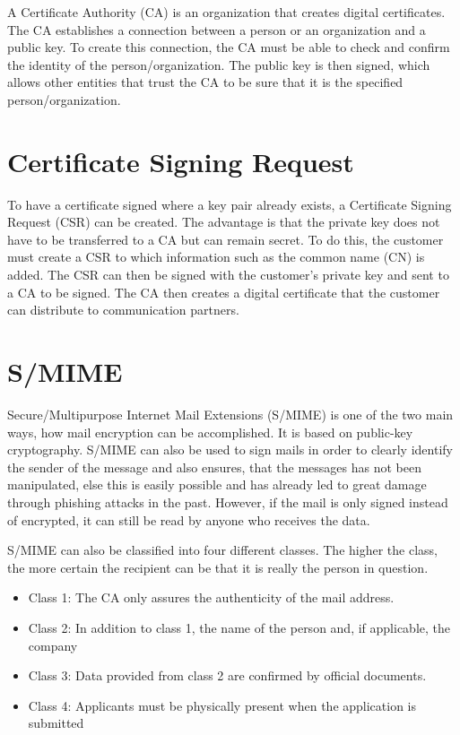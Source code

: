 \documentclass[12pt,oneside,a4paper,parskip]{scrbook}
\begin{document}
A Certificate Authority (CA) is an organization that creates digital certificates. The CA establishes a connection between a person or an organization and a public key. To create this connection, the CA must be able to check and confirm the identity of the person/organization. The public key is then signed, which allows other entities that trust the CA to be sure that it is the specified person/organization.
\parencite{luber_ca_2018}

\section{Certificate Signing Request}
\label{sec:CSR}

To have a certificate signed where a key pair already exists, a Certificate Signing Request (CSR) can be created. The advantage is that the private key does not have to be transferred to a CA but can remain secret. To do this, the customer must create a CSR to which information such as the common name (CN) is added. The CSR can then be signed with the customer's private key and sent to a CA to be signed. The CA then creates a digital certificate that the customer can distribute to communication partners.
\parencite{publico_ssl-grundlagen_2017}


\section{S/MIME}
Secure/Multipurpose Internet Mail Extensions (S/MIME) is one of the two main ways, how mail encryption can be accomplished. It is based on public-key cryptography. S/MIME can also be used to sign mails in order to clearly identify the sender of the message and also ensures, that the messages has not been manipulated, 
else this is easily possible and has already led to great damage through phishing attacks in the past. 
However, if the mail is only signed instead of encrypted, it can still be read by anyone who receives the data. \parencite{villadiego_dangers_2017}

S/MIME can also be classified into four different classes. The higher the class, the more certain the recipient can be that it is really the person in question.
\begin{itemize}
    \item Class 1: The CA only assures the authenticity of the mail address.
    \item Class 2: In addition to class 1, the name of the person and, if applicable, the company
    \item Class 3: Data provided from class 2 are confirmed by official documents.
    \item Class 4: Applicants must be physically present when the application is submitted
\end{itemize}
\end{document}
